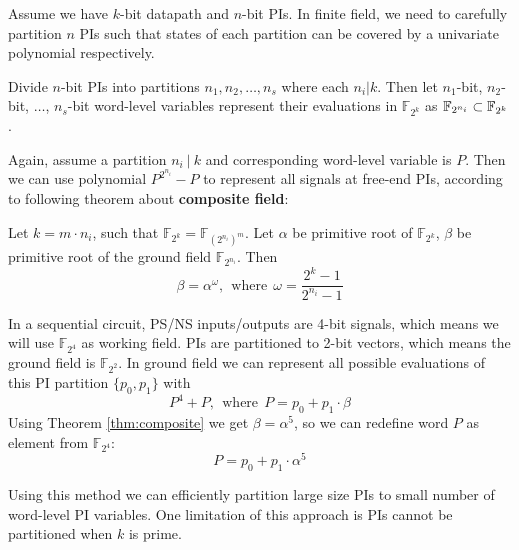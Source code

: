 \begin{figure}[hbt]
\end{figure}

Assume we have $k$-bit datapath and $n$-bit PIs. In finite field, we need to carefully partition $n$ PIs
such that states of each partition can be covered by a univariate polynomial respectively.

\begin{Proposition}
Divide $n$-bit PIs into partitions $n_1,n_2,\dots, n_s$ where each $n_i|k$. Then let $n_1$-bit, $n_2$-bit, $\dots$, $n_s$-bit word-level variables
represent their evaluations in $\mathbb F_{2^k}$ as ${\mathbb{F}}_{2^{n_i}} \subset {\mathbb{F}}_{2^k}$.
\end{Proposition}

Again, assume a partition $n_i~|~k$ and corresponding word-level variable is $P$. Then we can use polynomial
$P^{2^{n_i}}-P$ to represent all signals at free-end PIs, according to following theorem about {\bf composite
field}:
\begin{Theorem}
\label{thm:composite}
Let $k = m\cdot n_i$, such that $\mathbb F_{2^k} = \mathbb F_{(2^{n_i})^m}$. Let $\alpha$ be primitive root of 
$\mathbb F_{2^k}$, $\beta$ be primitive root of the ground field $\mathbb F_{2^{n_i}}$. Then
$$\beta = \alpha^\omega,~~\text{where}~~\omega = \frac{2^k-1}{2^{n_i}-1}$$
\end{Theorem}
\begin{Example}
\label{ex:PI}
In a sequential circuit, PS/NS inputs/outputs are 4-bit signals, which means we will use $\mathbb F_{2^4}$
as working field. PIs are partitioned to 2-bit vectors, which means the ground field is $\mathbb F_{2^2}$.
In ground field we can represent all possible evaluations of this PI partition $\{p_0,p_1\}$ with
$$P^4+P,~~\text{where}~~P=p_0+p_1\cdot\beta$$
Using Theorem \ref{thm:composite} we get $\beta = \alpha^5$, so we can redefine word $P$ as element from $\mathbb F_{2^4}$:
$$P = p_0 + p_1\cdot\alpha^5$$
\end{Example}
Using this method we can efficiently partition large size PIs to small number of word-level PI variables.
One limitation of this approach is PIs cannot be partitioned when $k$ is prime.

